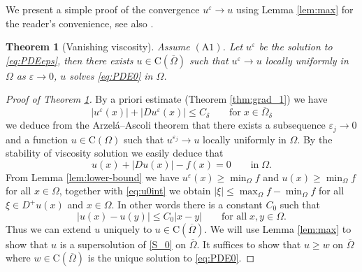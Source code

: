\documentclass[11pt,reqno]{amsart}
\numberwithin{figure}{section}
\theoremstyle{plain}
\newtheorem{thm}{Theorem}[section]
\theoremstyle{remark}
\numberwithin{equation}{section}
\newcommand{\rmC}{\mathrm{C}}
\begin{document}
We present a simple proof of the convergence $u^\varepsilon \to u$ using Lemma \ref{lem:max} for the reader's convenience, see also \cite[Theorem VII.3]{Capuzzo-Dolcetta1990}.
\begin{thm}[Vanishing viscosity]\label{thm:qual} Assume $\mathrm{(A1)}$. Let $u^\varepsilon$ be the solution to \eqref{eq:PDEeps}, then there exists $u \in \mathrm{C}(\overline{\Omega})$ such that $u^\varepsilon \rightarrow u$ locally uniformly in $\Omega$ as $\varepsilon\rightarrow 0$, $u$ solves \eqref{eq:PDE0} in $\Omega$.
\end{thm}

\begin{proof}[Proof of Theorem \ref{thm:qual}] By a priori estimate (Theorem \ref{thm:grad_1}) we have
\begin{equation}\label{e:priorie_eps}
    |u^\varepsilon(x)| + |Du^\varepsilon(x)| \leq C_\delta \qquad\text{for}\;x\in \overline{\Omega}_\delta
\end{equation}
we deduce from the Arzel\'a--Ascoli theorem that there exists a subsequence $\varepsilon_j\to 0$ and a function $u\in \rmC(\Omega)$ such that $u^{\varepsilon_j}\to u$ locally uniformly in $\Omega$. By the stability of viscosity solution we easily deduce that 
\begin{equation}\label{eq:u0int}
     u(x) + |Du(x)| - f(x) = 0 \qquad\text{in}\;\Omega.
\end{equation}
From Lemma \ref{lem:lower-bound} we have $  u^\varepsilon(x)\geq \min_{\Omega} f$ and  $  u(x)\geq \min_{\Omega} f$ for all $x\in \Omega$, together with \eqref{eq:u0int} we obtain $|\xi|\leq \max_\Omega f - \min_\Omega f$ for all $\xi\in D^+u(x)$ and $x\in \Omega$. In other words there is a constant $C_0$ such that
\begin{equation*}
    |u(x) - u(y)| \leq C_0|x-y| \qquad\text{for all}\;x,y\in \Omega.
\end{equation*}
Thus we can extend $u$ uniquely to $u\in \rmC(\overline{\Omega})$. We will use Lemma \ref{lem:max} to show that $u$ is a supersolution of \eqref{S_0} on $\overline{\Omega}$. It suffices to show that $u\geq w$ on $\overline{\Omega}$ where $w\in \rmC(\overline{\Omega})$ is the unique solution to \eqref{eq:PDE0}.


\end{proof}
\end{document}
